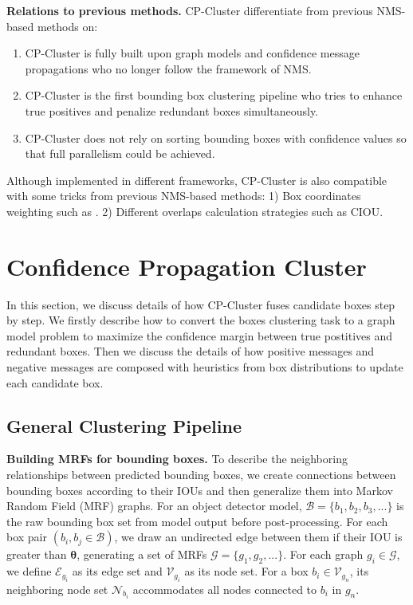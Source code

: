 \documentclass[10pt,twocolumn,letterpaper]{article}
\begin{document}
\textbf{Relations to previous methods.} CP-Cluster differentiate from previous NMS-based methods on:
\begin{enumerate}
  \item CP-Cluster is fully built upon graph models and confidence message propagations who no longer follow the framework of NMS.
  \item CP-Cluster is the first bounding box clustering pipeline who tries to enhance true positives and penalize redundant boxes simultaneously.
  \item CP-Cluster does not rely on sorting bounding boxes with confidence values so that full parallelism could be achieved.
\end{enumerate}
Although implemented in different frameworks, CP-Cluster is also compatible with some tricks from previous NMS-based methods: 1) Box coordinates weighting such as \cite{zhou2017cad,solovyev2021weighted}. 2) Different overlaps calculation strategies such as CIOU\cite{zheng2020distance}.
\section{Confidence Propagation Cluster}
\label{sec:cpcluster}
In this section, we discuss details of how CP-Cluster fuses candidate boxes step by step.
We firstly describe how to convert the boxes clustering task to a graph model problem to maximize the confidence margin between true postitives and redundant boxes.
Then we discuss the details of how positive messages and negative messages are composed with heuristics from box distributions to update each candidate box.

\subsection{General Clustering Pipeline}
\label{sec:sub_overview}
\textbf{Building MRFs for bounding boxes.} To describe the neighboring relationships between predicted bounding boxes, we create connections between bounding boxes according to their IOUs and then generalize them into Markov Random Field (MRF) graphs.
For an object detector model, $\mathcal{B}=\{b_1,b_2,b_3,...\}$ is the raw bounding box set from model output before post-processing.
For each box pair $(b_i,b_j\in\mathcal{B})$, we draw an undirected edge between them if their IOU is greater than $\mathbf{\theta}$, generating a set of MRFs $\mathcal{G}=\{g_1,g_2,...\}$.
For each graph $g_i\in\mathcal{G}$, we define $\mathcal{E}_{g_{i}}$ as its edge set and $\mathcal{V}_{g_{i}}$ as its node set.
For a box $b_i\in\mathcal{V}_{g_{n}}$, its neighboring node set $\mathcal{N}_{b_{i}}$ accommodates all nodes connected to $b_i$ in $g_n$.
\end{document}
